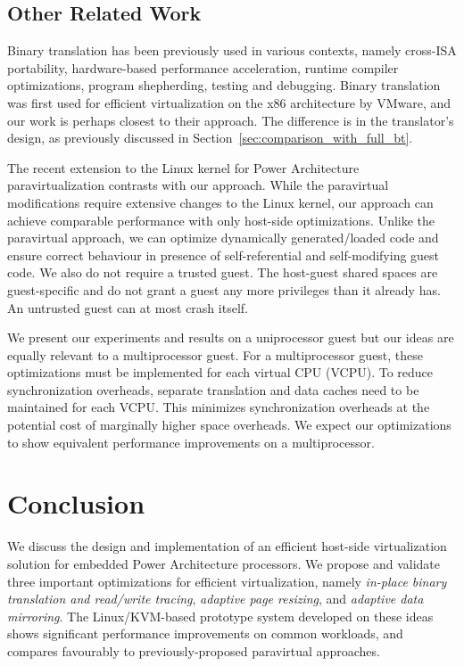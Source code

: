 \documentclass[10pt,twocolumn]{article}
\begin{document}
\subsection{Other Related Work}
Binary translation has been previously used in various contexts, namely
cross-ISA portability\cite{bansal:osdi08, qemu:software}, hardware-based
performance acceleration\cite{transmeta_crusoe:chip}, runtime compiler
optimizations\cite{bala00dynamo}, program shepherding\cite{bruening04thesis},
testing and debugging\cite{valgrind}. Binary translation was
first used for efficient virtualization on the x86 architecture by
VMware\cite{adams:asplos06}, and our work
is perhaps closest to their approach. The difference is in the translator's design,
as previously discussed in Section~\ref{sec:comparison_with_full_bt}.

The recent extension to the Linux kernel for Power Architecture paravirtualization
contrasts with our approach. While the paravirtual modifications require extensive
changes to the Linux kernel, our approach can achieve comparable performance
with only host-side optimizations. Unlike the paravirtual approach, we can optimize
dynamically generated/loaded code and ensure correct behaviour in presence of
self-referential and self-modifying guest code.
We also do not require a trusted guest. The host-guest shared spaces
are guest-specific and do not grant a guest any more privileges than it
already has. An untrusted guest can at most crash itself.

We present our experiments and results on a uniprocessor guest but our
ideas are equally relevant to a multiprocessor guest. For a multiprocessor
guest, these optimizations must be implemented for each virtual CPU (VCPU).
To reduce synchronization
overheads, separate translation and data caches need to be maintained for each VCPU.
This minimizes synchronization overheads at the potential cost of marginally higher
space overheads. We expect
our optimizations to show equivalent performance improvements on a multiprocessor.
\section{Conclusion}
\label{sec:conclusion}
We discuss the design and implementation of an efficient host-side virtualization
solution
for embedded Power Architecture processors. We propose and validate three important
optimizations
for efficient virtualization, namely {\em in-place binary translation and read/write
tracing}, {\em adaptive page resizing}, and {\em adaptive data mirroring}. 
The Linux/KVM-based prototype system developed on these ideas shows significant
performance improvements on common workloads, and compares favourably to
previously-proposed paravirtual approaches.


\end{document}
